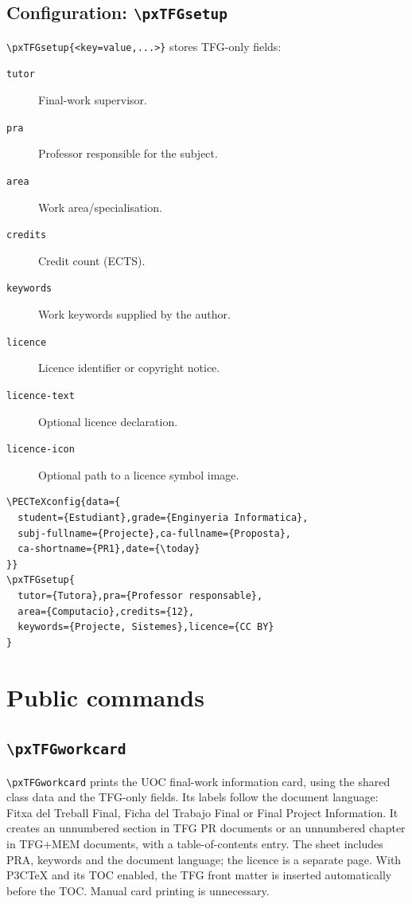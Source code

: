 \documentclass[11pt,a4paper]{article}
\begin{document}
\subsection{Configuration: \texttt{\textbackslash pxTFGsetup}}
\verb|\pxTFGsetup{<key=value,...>}| stores TFG-only fields:
\begin{description}
\item[\texttt{tutor}] Final-work supervisor.
\item[\texttt{pra}] Professor responsible for the subject.
\item[\texttt{area}] Work area/specialisation.
\item[\texttt{credits}] Credit count (ECTS).
\item[\texttt{keywords}] Work keywords supplied by the author.
\item[\texttt{licence}] Licence identifier or copyright notice.
\item[\texttt{licence-text}] Optional licence declaration.
\item[\texttt{licence-icon}] Optional path to a licence symbol image.
\end{description}
\begin{verbatim}
\PECTeXconfig{data={
  student={Estudiant},grade={Enginyeria Informatica},
  subj-fullname={Projecte},ca-fullname={Proposta},
  ca-shortname={PR1},date={\today}
}}
\pxTFGsetup{
  tutor={Tutora},pra={Professor responsable},
  area={Computacio},credits={12},
  keywords={Projecte, Sistemes},licence={CC BY}
}
\end{verbatim}

\section{Public commands}
\subsection{\texttt{\textbackslash pxTFGworkcard}}
\verb|\pxTFGworkcard| prints the UOC final-work information card,
using the shared class data and the TFG-only fields. Its labels
follow the document language: Fitxa del Treball Final, Ficha del
Trabajo Final or Final Project Information. It creates an unnumbered
section in TFG PR documents or an unnumbered chapter in TFG+MEM
documents, with a table-of-contents entry. The sheet includes PRA,
keywords and the document language; the licence is a separate page.
With P3CTeX and its TOC enabled, the TFG front matter is inserted
automatically before the TOC. Manual card printing is unnecessary.
\end{document}

